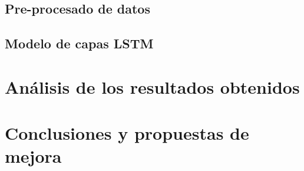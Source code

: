 \documentclass[10pt]{beamer}
\begin{document}
		\subsection{Pre-procesado de datos}
			
		\subsection{Modelo de capas LSTM}
			
	\section{Análisis de los resultados obtenidos}
		
	\section{Conclusiones y propuestas de mejora}
		
	
	
\end{document}
